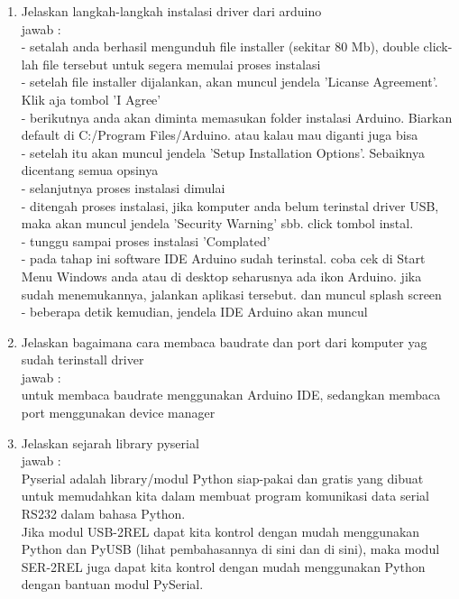 \begin{itemize}
\begin{enumerate}
\item Jelaskan langkah-langkah instalasi driver dari arduino\\
jawab :\\
- setalah anda berhasil mengunduh file installer (sekitar 80 Mb), double click-lah file tersebut untuk segera memulai proses instalasi\\
- setelah file installer dijalankan, akan muncul jendela 'Licanse Agreement'. Klik aja tombol 'I Agree'\\
- berikutnya anda akan diminta memasukan folder instalasi Arduino. Biarkan default di C:/Program Files/Arduino. atau kalau mau diganti juga bisa\\
- setelah itu akan muncul jendela 'Setup Installation Options'. Sebaiknya dicentang semua opsinya\\
- selanjutnya proses instalasi dimulai\\
- ditengah proses instalasi, jika komputer anda belum terinstal driver USB, maka akan muncul jendela 'Security Warning' sbb. click tombol instal.\\
- tunggu sampai proses instalasi 'Complated'\\
- pada tahap ini software IDE Arduino sudah terinstal. coba cek di Start Menu Windows anda atau di desktop seharusnya ada ikon Arduino. jika sudah menemukannya, jalankan aplikasi tersebut. dan muncul splash screen\\
- beberapa detik kemudian, jendela IDE Arduino akan muncul\\

\item Jelaskan bagaimana cara membaca baudrate dan port dari komputer yag sudah terinstall driver\\
jawab : \\
untuk membaca baudrate menggunakan Arduino IDE, sedangkan membaca port menggunakan device manager\\

\item Jelaskan sejarah library pyserial\\
jawab :\\
Pyserial adalah library/modul Python siap-pakai dan gratis yang dibuat untuk memudahkan kita dalam membuat program komunikasi data serial RS232 dalam bahasa Python.\\

Jika modul USB-2REL dapat kita kontrol dengan mudah menggunakan Python dan PyUSB (lihat pembahasannya di sini dan di sini), maka modul SER-2REL juga dapat kita kontrol dengan mudah menggunakan Python dengan bantuan modul PySerial.\\


\end{enumerate}
\end{itemize}
